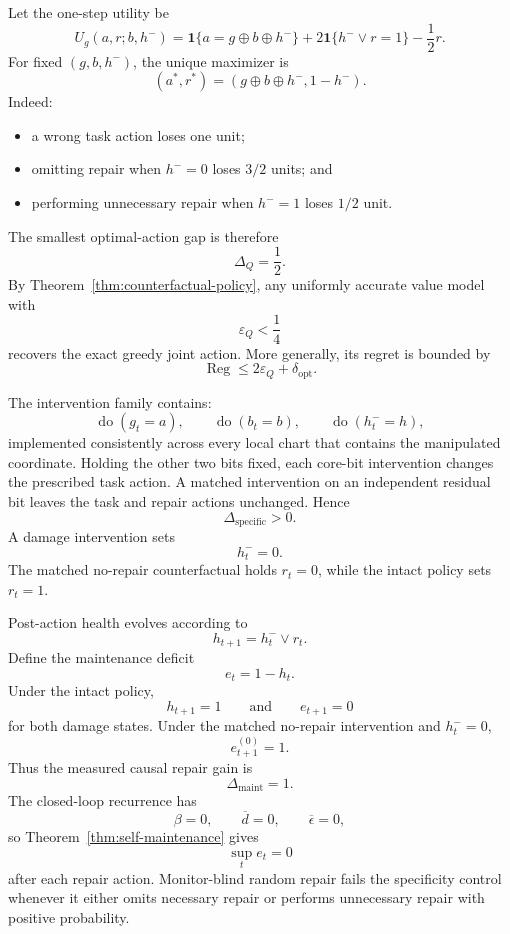 Let the one-step utility be
\[
U_g(a,r;b,h^-)
=
\mathbf 1\{a=g\oplus b\oplus h^-\}
+2\mathbf 1\{h^-\lor r=1\}
-\frac12r.
\]
For fixed \((g,b,h^-)\), the unique maximizer is
\[
\boxed{
(a^*,r^*)
=
(g\oplus b\oplus h^-,1-h^-).
}
\]
Indeed:
\begin{itemize}
\item a wrong task action loses one unit;
\item omitting repair when \(h^-=0\) loses \(3/2\) units; and
\item performing unnecessary repair when \(h^-=1\) loses \(1/2\) unit.
\end{itemize}
The smallest optimal-action gap is therefore
\[
\Delta_Q=\frac12.
\]
By Theorem~\ref{thm:counterfactual-policy}, any uniformly accurate value model with
\[
\varepsilon_Q<\frac14
\]
recovers the exact greedy joint action. More generally, its regret is bounded
by
\[
\operatorname{Reg}\leq2\varepsilon_Q+\delta_{\mathrm{opt}}.
\]


The intervention family contains:
\[
\operatorname{do}(g_t=a),
\qquad
\operatorname{do}(b_t=b),
\qquad
\operatorname{do}(h_t^-=h),
\]
implemented consistently across every local chart that contains the manipulated
coordinate. Holding the other two bits fixed, each core-bit intervention
changes the prescribed task action. A matched intervention on an independent
residual bit leaves the task and repair actions unchanged. Hence
\[
\Delta_{\mathrm{specific}}>0.
\]
A damage intervention sets
\[
h_t^-=0.
\]
The matched no-repair counterfactual holds \(r_t=0\), while the intact policy
sets \(r_t=1\).


Post-action health evolves according to
\[
h_{t+1}=h_t^-\lor r_t.
\]
Define the maintenance deficit
\[
e_t=1-h_t.
\]
Under the intact policy,
\[
h_{t+1}=1
\qquad\text{and}\qquad
e_{t+1}=0
\]
for both damage states. Under the matched no-repair intervention and
\(h_t^-=0\),
\[
e_{t+1}^{(0)}=1.
\]
Thus the measured causal repair gain is
\[
\boxed{
\Delta_{\mathrm{maint}}=1.
}
\]
The closed-loop recurrence has
\[
\beta=0,
\qquad
\overline d=0,
\qquad
\overline\epsilon=0,
\]
so Theorem~\ref{thm:self-maintenance} gives
\[
\sup_t e_t=0
\]
after each repair action. Monitor-blind random repair fails the specificity
control whenever it either omits necessary repair or performs unnecessary
repair with positive probability.

